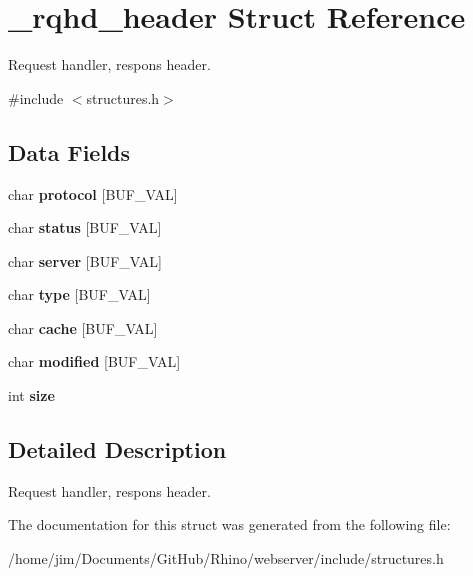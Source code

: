 \hypertarget{struct__rqhd__header}{}\section{\+\_\+rqhd\+\_\+header Struct Reference}
\label{struct__rqhd__header}


Request handler, respons header.  




{\ttfamily \#include $<$structures.\+h$>$}

\subsection*{Data Fields}
\begin{DoxyCompactItemize}
\item 
\hypertarget{struct__rqhd__header_a9b27a9d853f6b86c89e14dcc97a02b84}{}char {\bfseries protocol} \mbox{[}B\+U\+F\+\_\+\+V\+A\+L\mbox{]}\label{struct__rqhd__header_a9b27a9d853f6b86c89e14dcc97a02b84}

\item 
\hypertarget{struct__rqhd__header_a2350182ce9e30aa1b907de0779cff24a}{}char {\bfseries status} \mbox{[}B\+U\+F\+\_\+\+V\+A\+L\mbox{]}\label{struct__rqhd__header_a2350182ce9e30aa1b907de0779cff24a}

\item 
\hypertarget{struct__rqhd__header_a23bc223de49974b82ece89cd8a80f642}{}char {\bfseries server} \mbox{[}B\+U\+F\+\_\+\+V\+A\+L\mbox{]}\label{struct__rqhd__header_a23bc223de49974b82ece89cd8a80f642}

\item 
\hypertarget{struct__rqhd__header_ad1ea6613159c6c20dfd7427041428def}{}char {\bfseries type} \mbox{[}B\+U\+F\+\_\+\+V\+A\+L\mbox{]}\label{struct__rqhd__header_ad1ea6613159c6c20dfd7427041428def}

\item 
\hypertarget{struct__rqhd__header_aa624b6831909b55f315899b315f256e8}{}char {\bfseries cache} \mbox{[}B\+U\+F\+\_\+\+V\+A\+L\mbox{]}\label{struct__rqhd__header_aa624b6831909b55f315899b315f256e8}

\item 
\hypertarget{struct__rqhd__header_a66208b4829ec43bb54a650df71b0b642}{}char {\bfseries modified} \mbox{[}B\+U\+F\+\_\+\+V\+A\+L\mbox{]}\label{struct__rqhd__header_a66208b4829ec43bb54a650df71b0b642}

\item 
\hypertarget{struct__rqhd__header_a4e83bf48a4ef0a06ee55867bfd1650a5}{}int {\bfseries size}\label{struct__rqhd__header_a4e83bf48a4ef0a06ee55867bfd1650a5}

\end{DoxyCompactItemize}


\subsection{Detailed Description}
Request handler, respons header. 

The documentation for this struct was generated from the following file\+:\begin{DoxyCompactItemize}
\item 
/home/jim/\+Documents/\+Git\+Hub/\+Rhino/webserver/include/structures.\+h\end{DoxyCompactItemize}
